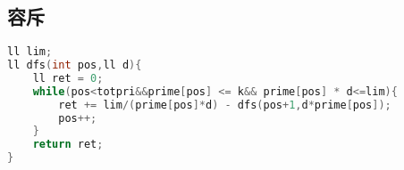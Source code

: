 \subsection{容斥}
		\begin{lstlisting}[language=c++]
ll lim;
ll dfs(int pos,ll d){
	ll ret = 0;
	while(pos<totpri&&prime[pos] <= k&& prime[pos] * d<=lim){
		ret += lim/(prime[pos]*d) - dfs(pos+1,d*prime[pos]);
		pos++;
	}
	return ret;
}
	\end{lstlisting}